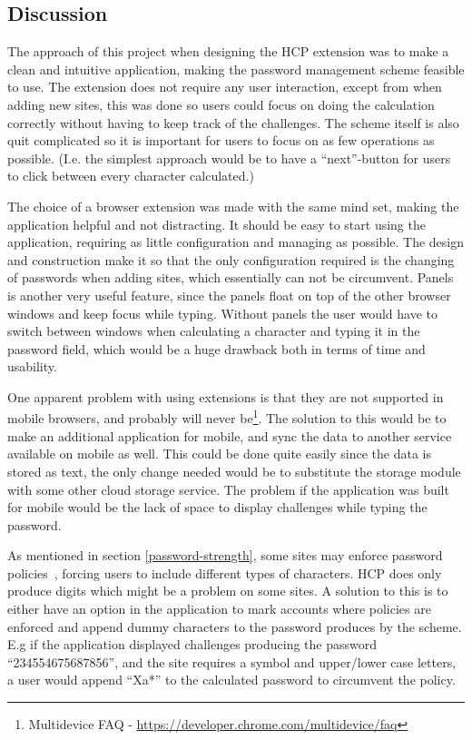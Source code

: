 \subsection{Discussion}
The approach of this project when designing the HCP extension was to make a clean and intuitive application, making the password management scheme feasible to use. The extension does not require any user interaction, except from when adding new sites, this was done so users could focus on doing the calculation correctly without having to keep track of the challenges. The scheme itself is also quit complicated so it is important for users to focus on as few operations as possible. (I.e. the simplest approach would be to have a ``next''-button for users to click between every character calculated.)
\par The choice of a browser extension was made with the same mind set, making the application helpful and not distracting. It should be easy to start using the application, requiring as little configuration and managing as possible. The design and construction make it so that the only configuration required is the changing of passwords when adding sites, which essentially can not be circumvent. Panels is another very useful feature, since the panels float on top of the other browser windows and keep focus while typing. Without panels the user would have to switch between windows when calculating a character and typing it in the password field, which would be a huge drawback both in terms of time and usability. 
\par One apparent problem with using extensions is that they are not supported in mobile browsers, and probably will never be\footnote{Multidevice FAQ - \url{https://developer.chrome.com/multidevice/faq}}. The solution to this would be to make an additional application for mobile, and sync the data to another service available on mobile as well. This could be done quite easily since the data is stored as text, the only change needed would be to substitute the storage module with some other cloud storage service. The problem if the application was built for mobile would be the lack of space to display challenges while typing the password. 
\par As mentioned in section \ref{password-strength}, some sites may enforce password policies~\cite{password-policy}, forcing users to include different types of characters. HCP does only produce digits which might be a problem on some sites. A solution to this is to either have an option in the application to mark accounts where policies are enforced and append dummy characters to the password produces by the scheme. E.g if the application displayed challenges producing the password ``234554675687856'', and the site requires a symbol and upper/lower case letters, a user would append ``Xa*'' to the calculated password to circumvent the policy. 
